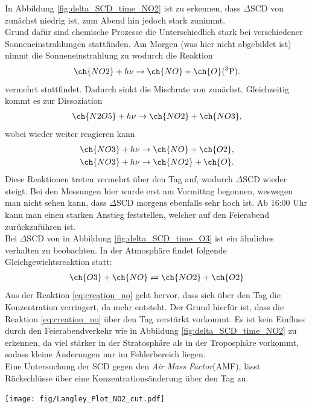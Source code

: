 \documentclass[12pt, a4paper, bibliography=totoc]{scrartcl}
\begin{document}
\begin{multicols}{2}
In Abbildung \ref{fig:delta_SCD_time_NO2} ist zu erkennen, dass $\Delta$SCD von  zunächst niedrig ist, zum Abend hin jedoch stark zunimmt.\\
Grund dafür sind chemische Prozesse die Unterschiedlich stark bei verschiedener Sonneneinstrahlungen stattfinden.
Am Morgen (was hier nicht abgebildet ist) nimmt die Sonneneinstrahlung zu wodurch die Reaktion
\begin{align}
    \ch{NO2} + h \nu \to \ch{NO} + \ch{O} (^3\text{P}). \label{eq:creation_no}
\end{align}
vermehrt stattfindet.
Dadurch sinkt die Mischrate von  zunächst.
Gleichzeitig kommt es zur Dissoziation 
\begin{align}
    \ch{N2O5} + h\nu \to \ch{NO2} + \ch{NO3},
\end{align}
wobei  wieder weiter reagieren kann
\begin{align}
    \ch{NO3} + h\nu \to \ch{NO} + \ch{O2}, \\
    \ch{NO3} + h\nu \to \ch{NO2} + \ch{O}.
\end{align}
Diese Reaktionen treten vermehrt über den Tag auf, wodurch $\Delta$SCD wieder steigt. 
Bei den Messungen hier wurde erst am Vormittag begonnen, weswegen man nicht sehen kann, dass $\Delta$SCD morgens ebenfalls sehr hoch ist.
Ab 16:00 Uhr kann man einen starken Anstieg feststellen, welcher auf den Feierabend zurückzuführen ist.\\
Bei $\Delta$SCD von  in Abbildung \ref{fig:delta_SCD_time_O3} ist ein ähnliches verhalten zu beobachten.
In der Atmosphäre findet folgende Gleichgewichtsreaktion statt:
\begin{align}
    \ch{O3} + \ch{NO} \rightleftharpoons \ch{NO2} + \ch{O2}
\end{align}
Aus der Reaktion \ref{eq:creation_no} geht hervor, dass sich über den Tag die  Konzentration verringert, da mehr  entsteht.
Der Grund hierfür ist, dass die Reaktion \ref{eq:creation_no} über den Tag verstärkt vorkommt.
Es ist kein Einfluss durch den Feierabendverkehr wie in Abbildung \ref{fig:delta_SCD_time_NO2} zu erkennen, da  viel stärker in der Stratosphäre als in der Troposphäre vorkommt, sodass kleine  Änderungen nur im Fehlerbereich liegen.
\\
Eine Untersuchung der SCD gegen den \textit{Air Mass Factor}(AMF), lässt Rückschlüsse über eine Konzentrationsänderung über den Tag zu.

\begin{center}
	\texttt{[image: fig/Langley\_Plot\_NO2\_cut.pdf]}
	\label{fig:langley_NO2}
\end{center}


\end{multicols}
\end{document}
